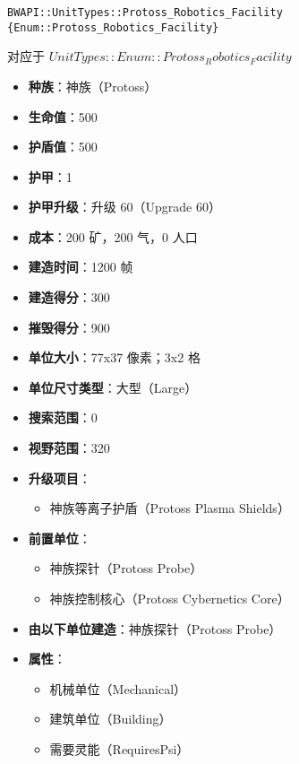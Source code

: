 \begin{tcolorbox}[colback=white, colframe=black!60!white, title=Protoss\_Robotics\_Facility(), arc=0mm]
    \begin{verbatim}
BWAPI::UnitTypes::Protoss_Robotics_Facility {Enum::Protoss_Robotics_Facility}
    \end{verbatim}
    对应于  $ UnitTypes::Enum::Protoss_Robotics_Facility $ 
    \begin{itemize}
        \item \textbf{种族}：神族（Protoss）
        \item \textbf{生命值}：500
        \item \textbf{护盾值}：500
        \item \textbf{护甲}：1
        \item \textbf{护甲升级}：升级 60（Upgrade 60）
        \item \textbf{成本}：200 矿，200 气，0 人口
        \item \textbf{建造时间}：1200 帧
        \item \textbf{建造得分}：300
        \item \textbf{摧毁得分}：900
        \item \textbf{单位大小}：77x37 像素；3x2 格
        \item \textbf{单位尺寸类型}：大型（Large）
        \item \textbf{搜索范围}：0
        \item \textbf{视野范围}：320
        \item \textbf{升级项目}：
            \begin{itemize}
                \item 神族等离子护盾（Protoss Plasma Shields）
            \end{itemize}
        \item \textbf{前置单位}：
            \begin{itemize}
                \item 神族探针（Protoss Probe）
                \item 神族控制核心（Protoss Cybernetics Core）
            \end{itemize}
        \item \textbf{由以下单位建造}：神族探针（Protoss Probe）
        \item \textbf{属性}：
            \begin{itemize}
                \item 机械单位（Mechanical）
                \item 建筑单位（Building）
                \item 需要灵能（RequiresPsi）
            \end{itemize}
    \end{itemize}
\end{tcolorbox}

